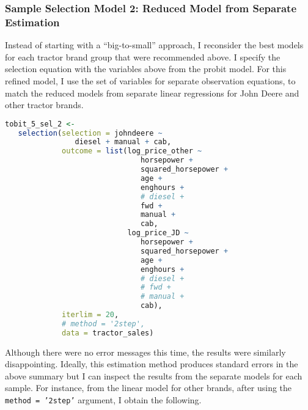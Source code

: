 \subsubsection{Sample Selection Model 2: Reduced Model from Separate Estimation}

Instead of starting with a ``big-to-small'' approach,
I reconsider the best models for each tractor brand group 
that were recommended above.
I specify the selection equation with the variables above
from the probit model.
For this refined model, I use the set of variables
for separate observation equations,
to match the reduced models from separate linear regressions
for John Deere and other tractor brands.


\begin{lstlisting}[language=R]
tobit_5_sel_2 <-
   selection(selection = johndeere ~
                diesel + manual + cab,
             outcome = list(log_price_other ~
                               horsepower +
                               squared_horsepower +
                               age +
                               enghours +
                               # diesel +
                               fwd +
                               manual +
                               cab,
                            log_price_JD ~
                               horsepower +
                               squared_horsepower +
                               age +
                               enghours +
                               # diesel +
                               # fwd +
                               # manual +
                               cab),
             iterlim = 20,
             # method = '2step',
             data = tractor_sales)

\end{lstlisting}

Although there were no error messages this time, 
the results were similarly disappointing. 
Ideally, this estimation method produces standard errors in the above summary
but I can inspect the results from the separate models for each sample.
For instance, from the linear model for other brands, 
after using the \texttt{method = '2step'} argument, I obtain the following.

